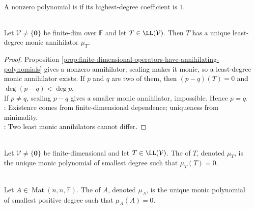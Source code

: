 \begin{definition} \label{def:monic-polynomial} \\
A nonzero polynomial is  if its highest-degree coefficient is $1$.
\end{definition}

\begin{theorem} \label{thm:operator-minimal-polynomial-existence} \\
Let $\mathcal{V}\neq\{\mathbf{0}\}$ be finite-dim over $\mathbb{F}$ and let $T\in\LL(\mathcal{V})$. Then $T$ has a unique least-degree monic annihilator $\mu_T$.
\begin{proof}
Proposition \ref{prop:finite-dimensional-operators-have-annihilating-polynomials} gives a nonzero annihilator; scaling makes it monic, so a least-degree monic annihilator exists. If $p$ and $q$ are two of them, then $(p-q)(T)=0$ and $\deg(p-q)<\deg p$.\\
If $p\neq q$, scaling $p-q$ gives a smaller monic annihilator, impossible. Hence $p=q$.\\
: Existence comes from finite-dimensional dependence; uniqueness from minimality.\\
: Two least monic annihilators cannot differ.
\end{proof}
\end{theorem}

\begin{definition} \label{def:operator-minimal-polynomial} \\
Let $\mathcal{V}\neq\{\mathbf{0}\}$ be finite-dimensional and let $T\in\LL(\mathcal{V})$. The  of $T$, denoted $\mu_T$, is the unique monic polynomial of smallest degree such that $\mu_T(T)=0$.
\end{definition}

\begin{definition} \label{def:minimal-polynomial-matrix} \\
Let $A\in\operatorname{Mat}(n,n,\mathbb{F})$. The  of $A$, denoted $\mu_A$, is the unique monic polynomial of smallest positive degree such that $\mu_A(A)=0$.
\end{definition}

